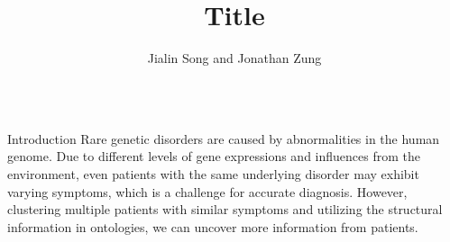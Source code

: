 \documentclass[final]{beamer} %
\title[]{{\fontsize{240}{240}\selectfont Title}}
\author[]{Jialin Song and Jonathan Zung}
\institute[University of Toronto]{Computational Biology Lab, University of Toronto}
\begin{document}
  \begin{frame}{}
  \maketitle
    \begin{columns}[T]
      \begin{column}{0.3\linewidth}
    \begin{block}{\Huge Introduction}
    \Large
    Rare genetic disorders are caused by abnormalities in the human genome. Due to different levels of gene expressions and influences from the environment, even patients with the same underlying disorder may exhibit varying symptoms, which is a challenge for accurate diagnosis. However, clustering multiple patients with similar symptoms and utilizing the structural information in ontologies, we can uncover more information from patients.
   \vspace{3cm}

    \end{block}
    

\end{column}
\end{columns}
\end{frame}
\end{document}
